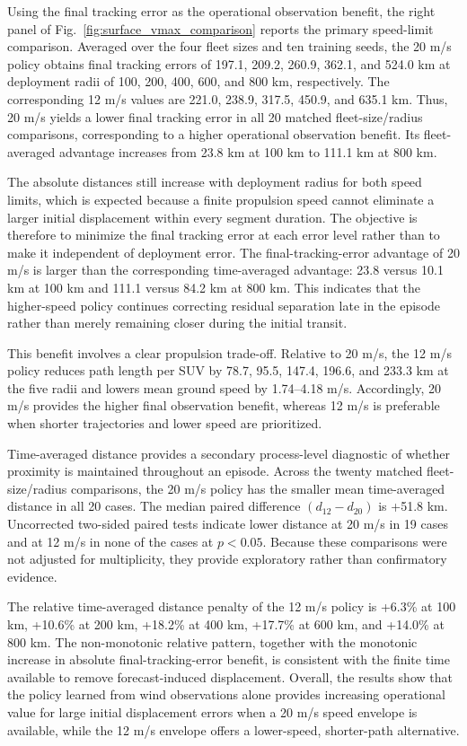 Using the final tracking error as the operational observation benefit, the right
panel of Fig.~\ref{fig:surface_vmax_comparison} reports the primary
speed-limit comparison. Averaged over the four fleet sizes and ten training
seeds, the 20 m/s policy obtains final tracking errors of 197.1, 209.2, 260.9,
362.1, and 524.0 km at deployment radii of 100, 200, 400, 600, and 800 km,
respectively. The corresponding 12 m/s values are 221.0, 238.9, 317.5, 450.9,
and 635.1 km. Thus, 20 m/s yields a lower final tracking error in all 20
matched fleet-size/radius comparisons, corresponding to a higher operational
observation benefit. Its fleet-averaged advantage increases from 23.8 km at
100 km to 111.1 km at 800 km.

The absolute distances still increase with deployment radius for both speed
limits, which is expected because a finite propulsion speed cannot eliminate a
larger initial displacement within every segment duration. The objective is
therefore to minimize the final tracking error at each error level rather than to
make it independent of deployment error. The final-tracking-error advantage of
20 m/s is larger than the corresponding time-averaged advantage: 23.8 versus
10.1 km at 100 km and 111.1 versus 84.2 km at 800 km. This indicates that the
higher-speed policy continues correcting residual separation late in the
episode rather than merely remaining closer during the initial transit.

This benefit involves a clear propulsion trade-off. Relative to 20 m/s, the
12 m/s policy reduces path length per SUV by 78.7, 95.5, 147.4, 196.6, and
233.3 km at the five radii and lowers mean ground speed by 1.74--4.18 m/s.
Accordingly, 20 m/s provides the higher final observation benefit, whereas
12 m/s is preferable when shorter trajectories and lower speed are prioritized.

Time-averaged distance provides a secondary process-level diagnostic of
whether proximity is maintained throughout an episode. Across the twenty
matched fleet-size/radius comparisons, the 20 m/s policy has the smaller mean
time-averaged distance in all 20 cases. The median paired difference
$(d_{12}-d_{20})$ is +51.8 km. Uncorrected two-sided paired tests indicate
lower distance at 20 m/s in 19 cases and at 12 m/s in none of the cases at
$p<0.05$. Because these comparisons were not adjusted for multiplicity, they
provide exploratory rather than confirmatory evidence.

The relative time-averaged distance penalty of the 12 m/s policy is
+6.3\% at 100 km, +10.6\% at 200 km, +18.2\% at 400 km, +17.7\% at 600 km,
and +14.0\% at 800 km. The non-monotonic relative pattern, together with the
monotonic increase in absolute final-tracking-error benefit, is consistent with the
finite time available to remove forecast-induced displacement. Overall, the
results show that the policy learned from wind observations alone provides
increasing operational value for large initial displacement errors when a
20 m/s speed envelope is available, while the 12 m/s envelope offers a
lower-speed, shorter-path alternative.
